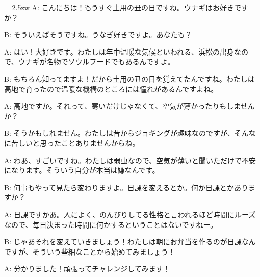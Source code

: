 \documentclass[11pt]{amsart}
\title{}
\author{}
\newenvironment{hangall}[1]{\hangindent = 2.5zw\everypar{\hangindent = 2.5zw}}{}
\begin{document}
\maketitle
\begin{hangall}{}%
A: こんにちは！もうすぐ土用の丑の日ですね。ウナギはお好きですか？

B: そういえばそうですね。うなぎ好きですよ。あなたも？

A: はい！大好きです。わたしは年中温暖な気候といわれる、浜松の出身なので、ウナギが名物でソウルフードでもあるんですよ。

B: もちろん知ってますよ！だから土用の丑の日を覚えてたんですね。わたしは高地で育ったので温暖な機構のところには憧れがあるんですよね。

A: 高地ですか。それって、寒いだけじゃなくて、空気が薄かったりもしませんか？

B: そうかもしれません。わたしは昔からジョギングが趣味なのですが、そんなに苦しいと思ったことありませんからね。

A: わあ、すごいですね。わたしは弱虫なので、空気が薄いと聞いただけで不安になります。そういう自分が本当は嫌なんです。

B: 何事もやって見たら変わりますよ。日課を変えるとか。何か日課とかありますか？

A: 日課ですかあ。人によく、のんびりしてる性格と言われるほど時間にルーズなので、毎日決まった時間に何かするということはないですねー。

B: じゃあそれを変えていきましょう！わたしは朝にお弁当を作るのが日課なんですが、そういう些細なことから始めてみましょう！

A: \ul{分かりました！頑張ってチャレンジしてみます！}\end{hangall}
\end{document}
